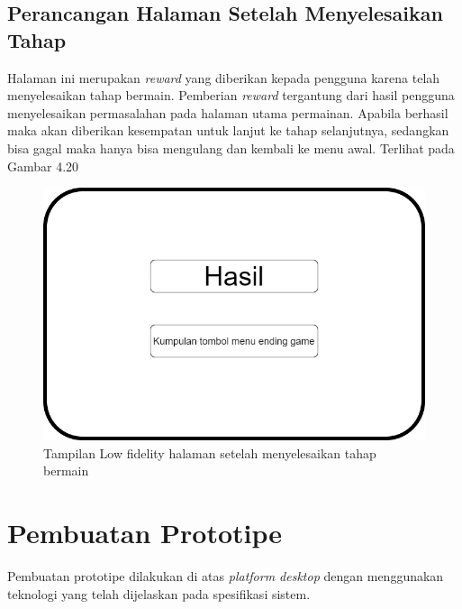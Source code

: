 	\subsection{Perancangan Halaman Setelah Menyelesaikan Tahap}
	Halaman ini merupakan \textit{reward} yang diberikan kepada pengguna karena telah menyelesaikan tahap bermain. Pemberian \textit{reward} tergantung dari hasil pengguna menyelesaikan permasalahan pada halaman utama permainan. Apabila berhasil maka akan diberikan kesempatan untuk lanjut ke tahap selanjutnya, sedangkan bisa gagal maka hanya bisa mengulang dan kembali ke menu awal. Terlihat pada Gambar 4.20
	\begin{figure}
		\centering
		\includegraphics[width=\linewidth-80pt]{pics/low/low4}
		\caption{Tampilan Low fidelity halaman setelah menyelesaikan tahap bermain}
	\end{figure}
	

\section{Pembuatan Prototipe}

Pembuatan prototipe dilakukan di atas \textit{platform desktop} dengan menggunakan teknologi yang telah dijelaskan pada spesifikasi sistem. 

